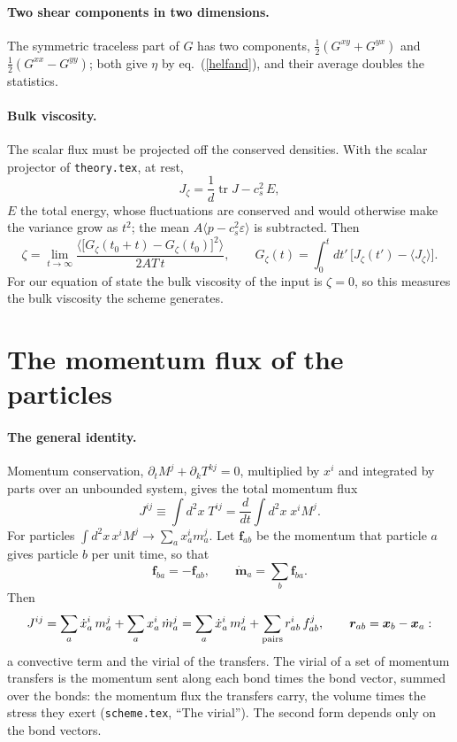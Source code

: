 \documentclass[11pt,aps,preprint,nofootinbib,superscriptaddress,tightenlines]{revtex4-2}
\def\st{\begin{equation}}
\def\stp{\end{equation}}
\def\Eq#1{eq.~(\ref{#1})}
\newcommand{\avg}[1]{\langle #1\rangle}
\def\tr{\operatorname{tr}}
\let\oldparagraph\paragraph
\renewcommand{\paragraph}{\par\bigskip\oldparagraph}
\begin{document}
\paragraph{Two shear components in two dimensions.}  The symmetric traceless part of $G$ has two components, $\frac12(G^{xy}+G^{yx})$
and $\frac12(G^{xx}-G^{yy})$; both give $\eta$ by \Eq{helfand}, and their average doubles the statistics.

\paragraph{Bulk viscosity.}  The scalar flux must be projected off the conserved densities.  With the scalar projector of
\texttt{theory.tex}, at rest,
\st
J_\zeta=\frac1d\tr J-c_s^2\,E ,
\stp
$E$ the total energy, whose fluctuations are conserved and would otherwise make the variance grow as $t^2$; the mean $A\avg{p-c_s^2\varepsilon}$
is subtracted.  Then
\st
\zeta=\lim_{t\to\infty}\frac{\avg{\big[G_\zeta(t_0+t)-G_\zeta(t_0)\big]^2}}{2AT\,t},\qquad G_\zeta(t)=\int_0^tdt'\,\big[J_\zeta(t')-\avg{J_\zeta}\big].
\stp
For our equation of state the bulk viscosity of the input is $\zeta=0$, so this measures the bulk viscosity the scheme generates.

\section{The momentum flux of the particles}
\label{sec:pbc}

\paragraph{The general identity.}  Momentum conservation, $\partial_tM^j+\partial_kT^{kj}=0$, multiplied by $x^i$ and integrated by parts over an
unbounded system, gives the total momentum flux
\st
J^{ij}\equiv\int d^2x\;T^{ij}=\frac d{dt}\int d^2x\;x^iM^j .
\stp
For particles $\int d^2x\,x^iM^j\to\sum_ax_a^im_a^j$.  Let $\bm f_{ab}$ be the momentum that particle $a$ gives particle $b$ per unit time, so that
\st
\bm f_{ba}=-\bm f_{ab},\qquad \dot{\bm m}_a=\sum_b\bm f_{ba} .
\stp
Then
\st
J^{ij}=\sum_a\dot x_a^i\,m_a^j+\sum_ax_a^i\,\dot m_a^j=\sum_a\dot x_a^i\,m_a^j+\sum_{\rm pairs}r_{ab}^i\,f_{ab}^j,\qquad \bm r_{ab}=\bm x_b-\bm x_a :
\label{Jgeneral}
\stp
a convective term and the virial of the transfers.  The virial of a set of momentum transfers is the momentum sent along each bond times
the bond vector, summed over the bonds: the momentum flux the transfers carry, the volume times the stress they exert (\texttt{scheme.tex},
``The virial'').  The second form depends only on the bond vectors.
\end{document}
